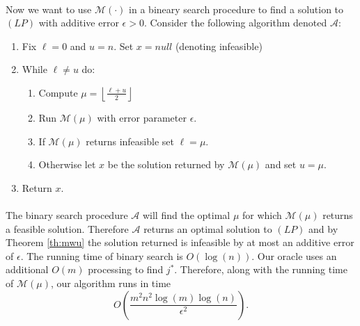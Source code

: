 \documentclass[letterpaper,12pt,oneside,onecolumn]{article}
\newcommand{\cA}{\mathcal{A}} \newcommand{\cB}{\mathcal{B}}
\newcommand{\cM}{\mathcal{M}} \newcommand{\cN}{\mathcal{N}}
\newcommand{\floor}[1]{\ensuremath{\left\lfloor#1\right\rfloor}}
\begin{document}
\paragraph{}
Now we want to use $\cM(\cdot)$ in a bineary search procedure to find a solution to $(LP)$ with additive error $\epsilon>0$. Consider the following algorithm denoted $\cA$:
\begin{enumerate}
\item Fix $\ell = 0$ and $u = n$. Set $x = null$ (denoting infeasible)
\item While $\ell \neq u$ do:
	\begin{enumerate}
	\item Compute $\mu = \floor{\frac{\ell + u}{2}}$
	\item Run $\cM(\mu)$ with error parameter $\epsilon$.
	\item If $\cM(\mu)$ returns infeasible set $\ell = \mu$.
	\item Otherwise let $x$ be the solution returned by $\cM(\mu)$ and set $u = \mu$.
	\end{enumerate}
\item Return $x$.
\end{enumerate}
\paragraph{}
The binary search procedure $\cA$ will find the optimal $\mu$ for which $\cM(\mu)$ returns a feasible solution. Therefore $\cA$ returns an optimal solution to $(LP)$ and by Theorem \ref{th:mwu} the solution returned is infeasible by at most an additive error of $\epsilon$. The running time of binary search is $O(\log(n))$. Our oracle uses an additional $O(m)$ processing to find $j^*$. Therefore, along with the running time of $\cM(\mu)$, our algorithm runs in time
$$O(\frac{m^2n^2\log(m)\log(n)}{\epsilon^2}).$$
\section{}
\end{document}
